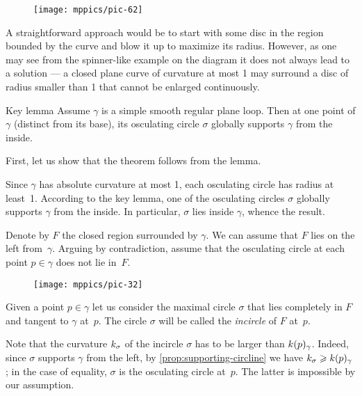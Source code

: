 {

\begin{wrapfigure}{r}{33 mm}
\vskip-4mm
\centering
\texttt{[image: mppics/pic-62]}
\vskip0mm
\end{wrapfigure}

A straightforward approach would be to start with some disc in the region bounded by the curve and blow it up to maximize its radius.
However, as one may see from the spinner-like example on the diagram it does not always lead to a solution --- a closed plane curve of curvature at most 1 may surround a disc of radius smaller than 1 that cannot be enlarged continuously.

}

\begin{thm}{Key lemma}\label{thm:moon}
Assume $\gamma$ is a simple smooth regular plane loop.
Then at one point of $\gamma$ (distinct from its base), its osculating circle $\sigma$ globally supports $\gamma$ from the inside.
\end{thm}

First, let us show that the theorem follows from the lemma.

Since $\gamma$ has absolute curvature at most 1, each osculating circle has radius at least~1.
According to the key lemma, one of the osculating circles $\sigma$ globally supports $\gamma$ from the inside.
In particular, $\sigma$ lies inside $\gamma$, whence the result.
\qeds

Denote by $F$ the closed region surrounded by $\gamma$.
We can assume that $F$ lies on the left from~$\gamma$.
Arguing by contradiction,
assume that the osculating circle at each point $p\in \gamma$ does not lie in~$F$.

\begin{figure}[!ht]
\vskip-0mm
\centering
\texttt{[image: mppics/pic-32]}
\vskip0mm
\end{figure}

Given a point $p\in\gamma$ let us consider the maximal circle $\sigma$ that lies completely in $F$ and tangent to $\gamma$ at~$p$.
The circle $\sigma$ will be called the {}\emph{incircle} of $F$ at~$p$.

Note that the curvature $k_\sigma$ of the incircle $\sigma$ has to be larger than $k(p)_\gamma$.
Indeed, since $\sigma$ supports $\gamma$ from the left, by \ref{prop:supporting-circline} we have $k_\sigma\geqslant k(p)_\gamma$; in the case of equality, $\sigma$ is the osculating circle at~$p$.
The latter is impossible by our assumption.

